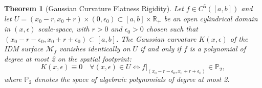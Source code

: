 \documentclass[11pt,a4paper]{article}
\newtheorem{theorem}{Theorem}
\theoremstyle{definition}
\begin{document}
\begin{theorem}[Gaussian Curvature Flatness Rigidity]
\label{thm:curvature_rigidity}
Let $f \in C^5([a, b])$ and let $U = (x_0 - r, x_0 + r) \times (0, \epsilon_0) \subset [a, b] \times \mathbb{R}_+$ be an open cylindrical domain in $(x, \epsilon)$ scale-space, with $r > 0$ and $\epsilon_0 > 0$ chosen such that $(x_0 - r - \epsilon_0, x_0 + r + \epsilon_0) \subset [a, b]$.
The Gaussian curvature $K(x, \epsilon)$ of the IDM surface $\mathcal{M}_f$ vanishes identically on $U$ if and only if $f$ is a polynomial of degree at most 2 on the spatial footprint:
\begin{equation}
K(x, \epsilon) \equiv 0 \quad \forall (x, \epsilon) \in U \iff f|_{(x_0 - r - \epsilon_0, x_0 + r + \epsilon_0)} \in \mathbb{P}_2,
\end{equation}
where $\mathbb{P}_2$ denotes the space of algebraic polynomials of degree at most 2.
\end{theorem}
\end{document}

